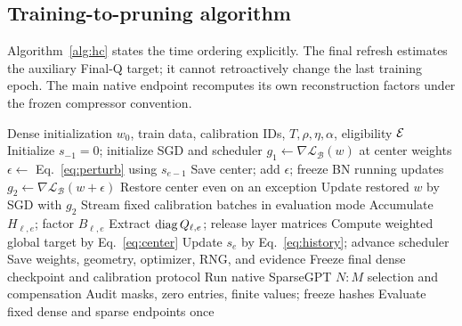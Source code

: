 \subsection{Training-to-pruning algorithm}
Algorithm~\ref{alg:hc} states the time ordering explicitly. The final refresh estimates the auxiliary Final-Q target; it cannot retroactively change the last training epoch. The main native endpoint recomputes its own reconstruction factors under the frozen compressor convention.
\begin{algorithm}[t]
\caption{HC-SAM with a native post-training endpoint}
\label{alg:hc}
\begin{algorithmic}[1]
\Require Dense initialization $w_0$, train data, calibration IDs, $T,\rho,\eta,\alpha$, eligibility $\mathcal{E}$
\State Initialize $s_{-1}=0$; initialize SGD and scheduler
    \State $g_1\gets\nabla\mathcal L_{\mathcal B}(w)$ at center weights
    \State $\epsilon\gets$ Eq.~\eqref{eq:perturb} using $s_{e-1}$
    \State Save center; add $\epsilon$; freeze BN running updates
    \State $g_2\gets\nabla\mathcal L_{\mathcal B}(w+\epsilon)$
    \State Restore center even on an exception
    \State Update restored $w$ by SGD with $g_2$
  \EndFor
    \State Stream fixed calibration batches in evaluation mode
    \State Accumulate $H_{\ell,e}$; factor $B_{\ell,e}$
    \State Extract $\operatorname{diag} Q_{\ell,e}$; release layer matrices
  \EndFor
  \State Compute weighted global target by Eq.~\eqref{eq:center}
  \State Update $s_e$ by Eq.~\eqref{eq:history}; advance scheduler
  \State Save weights, geometry, optimizer, RNG, and evidence
\EndFor
\State Freeze final dense checkpoint and calibration protocol
\State Run native SparseGPT $N{:}M$ selection and compensation
\State Audit masks, zero entries, finite values; freeze hashes
\State Evaluate fixed dense and sparse endpoints once
\end{algorithmic}
\end{algorithm}
